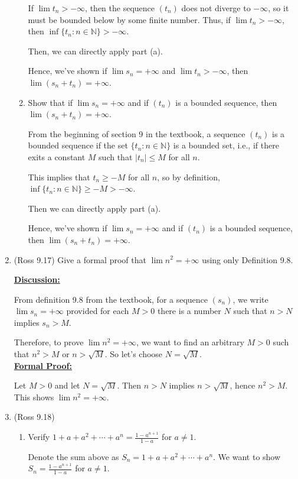 \documentclass [10pt]{article}
\newcommand{\jg}[1]{{\color{blue} #1}}
\begin{document}
\begin{enumerate}
\begin{enumerate}
\jg{
If $\lim t_n > - \infty$, then the sequence $(t_n)$ does not diverge to $- \infty$, so it must be bounded below by some finite number. Thus, if $\lim t_n > - \infty$, then $\inf\{t_n : n \in \mathbb{N}\} > -\infty$. 

Then, we can directly apply part (a). 

Hence, we've shown if $\lim s_n = +\infty$ and $\lim t_n > -\infty$, then $\lim (s_n + t_n) =+\infty$.
}
\item Show that if $\lim s_n = +\infty$ and if $(t_n)$ is a bounded sequence, then $\lim (s_n + t_n)=+\infty$.

\jg{
From the beginning of section 9 in the textbook, a sequence $(t_n)$ is a bounded sequence if the set $\{t_n : n \in \mathbb{N} \}$ is a bounded set, i.e., if there exits a constant $M$ such that $|t_n| \leq M$ for all $n$. 

This implies that $t_n \geq -M$ for all $n$, so by definition, $\inf \{t_n : n \in \mathbb{N} \} \geq -M > - \infty$. 

Then we can directly apply part (a). 

Hence, we've shown if $\lim s_n = +\infty$ and if $(t_n)$ is a bounded sequence, then $\lim (s_n + t_n)=+\infty$.
}
\end{enumerate}
\clearpage

\item (Ross 9.17)
Give a formal proof that $\lim n^2 = +\infty$ using only Definition 9.8.

\jg{
\textbf{\underline{Discussion:}}

From definition 9.8 from the textbook, for a sequence $(s_n)$, we write $\lim s_n = + \infty$ provided for each $M>0$ there is a number $N$ such that $n > N$ implies $s_n > M$. 

Therefore, to prove $\lim n^2 = + \infty$, we want to find an arbitrary $M > 0$ such that $n^2 > M$ or $n > \sqrt{M}$. So let's choose $N = \sqrt{M}$. \\

\textbf{\underline{Formal Proof:}}

Let $M > 0$ and let $N = \sqrt{M}$. Then $n > N$ implies $n > \sqrt{M}$, hence $n^2 > M$. This shows $\lim n^2 = + \infty$. 
}
\clearpage
\item (Ross 9.18)
\begin{enumerate}
\item Verify $1 + a + a^2 + \cdots + a^n = \frac{1-a^{n+1}}{1-a}$ for $a \neq 1$.

\jg{
Denote the sum above as $S_n = 1 + a + a^2 + \cdots + a^n$. We want to show $S_n = \frac{1-a^{n+1}}{1-a}$ for $a \neq 1$. 

}
\end{enumerate}
\end{enumerate}
\end{document}
